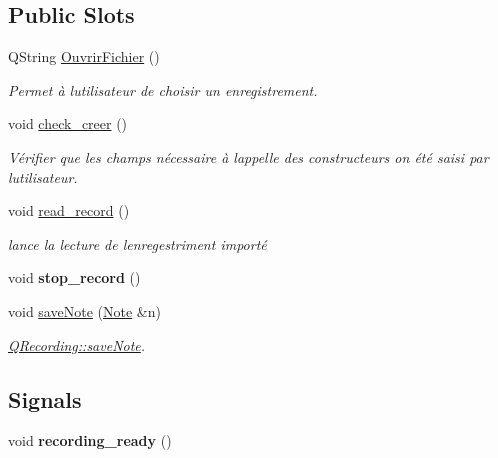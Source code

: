 \subsection*{Public Slots}
\begin{DoxyCompactItemize}
\item 
Q\+String \hyperlink{class_q_recording_a9eaf976da6c3c768d15a5e53f3982753}{Ouvrir\+Fichier} ()
\begin{DoxyCompactList}\small\item\em Permet à l\textquotesingle{}utilisateur de choisir un enregistrement. \end{DoxyCompactList}\item 
\mbox{\label{class_q_recording_ad889ab95e55e1ce9ebff8726aa916fe2}} 
void \hyperlink{class_q_recording_ad889ab95e55e1ce9ebff8726aa916fe2}{check\+\_\+creer} ()
\begin{DoxyCompactList}\small\item\em Vérifier que les champs nécessaire à l\textquotesingle{}appelle des constructeurs on été saisi par l\textquotesingle{}utilisateur. \end{DoxyCompactList}\item 
void \hyperlink{class_q_recording_a5c5c221fed1648c1813da1f195e26663}{read\+\_\+record} ()
\begin{DoxyCompactList}\small\item\em lance la lecture de l\textquotesingle{}enregestriment importé \end{DoxyCompactList}\item 
\mbox{\label{class_q_recording_a35476e910a18814b7beb0e73819279d8}} 
void {\bfseries stop\+\_\+record} ()
\item 
void \hyperlink{class_q_recording_a37492f3dbda2dad2a8cd62012fe91b78}{save\+Note} (\hyperlink{class_note}{Note} \&n)
\begin{DoxyCompactList}\small\item\em \hyperlink{class_q_recording_a37492f3dbda2dad2a8cd62012fe91b78}{Q\+Recording\+::save\+Note}. \end{DoxyCompactList}\end{DoxyCompactItemize}
\subsection*{Signals}
\begin{DoxyCompactItemize}
\item 
\mbox{\label{class_q_recording_aee0cf464a60e91f566bcff3d3caa3534}} 
void {\bfseries recording\+\_\+ready} ()
\end{DoxyCompactItemize}
